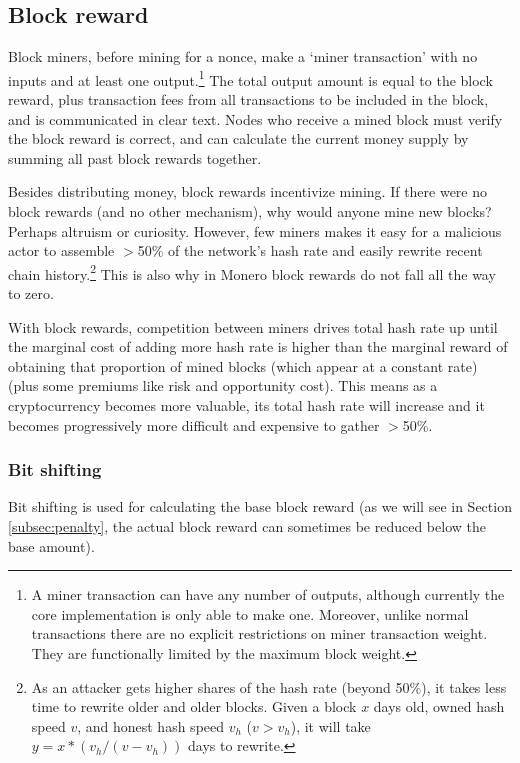 \subsection{Block reward}
\label{subsec:block-reward} %

Block miners, before mining for a nonce, make a `miner transaction' with no inputs and at least one output.\footnote{A miner transaction can have any number of outputs, although currently the core implementation is only able to make one. Moreover, unlike normal transactions there are no explicit restrictions on miner transaction weight. They are functionally limited by the maximum block weight.} The total output amount is equal to the block reward, plus transaction fees from all transactions to be included in the block, and is communicated in clear text. Nodes who receive a mined block must verify the block reward is correct, and can calculate the current money supply by summing all past block rewards together.

Besides distributing money, block rewards incentivize mining. If there were no block rewards (and no other mechanism), why would anyone mine new blocks? Perhaps altruism or curiosity. However, few miners makes it easy for a malicious actor to assemble $>$50\% of the network's hash rate and easily rewrite recent chain history.\footnote{As an attacker gets higher shares of the hash rate (beyond 50\%), it takes less time to rewrite older and older blocks. Given a block $x$ days old, owned hash speed $v$, and honest hash speed $v_h$ ($v > v_h$), it will take $y = x*(v_h/(v-v_h))$ days to rewrite.} This is also why in Monero block rewards do not fall all the way to zero.

With block rewards, competition between miners drives total hash rate up until the marginal cost of adding more hash rate is higher than the marginal reward of obtaining that proportion of mined blocks (which appear at a constant rate) (plus some premiums like risk and opportunity cost). This means as a cryptocurrency becomes more valuable, its total hash rate will increase and it becomes progressively more difficult and expensive to gather $>$50\%.

\subsubsection*{Bit shifting}

Bit shifting is used for calculating the base block reward (as we will see in Section \ref{subsec:penalty}, the actual block reward can sometimes be reduced below the base amount).

